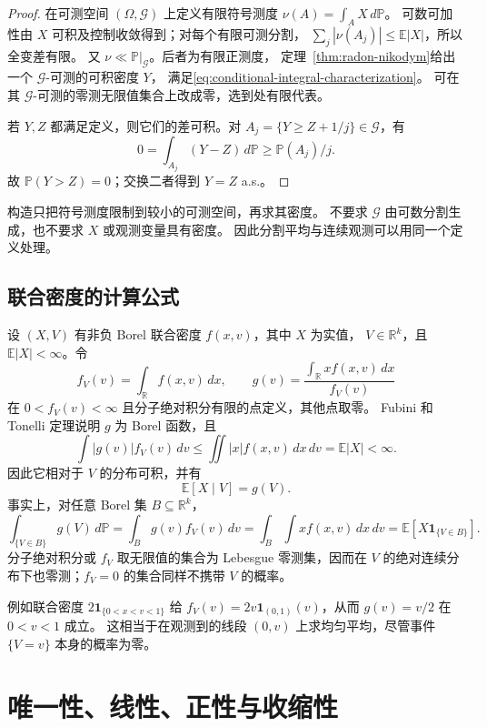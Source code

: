 \begin{proof}
在可测空间 $(\Omega,\mathcal G)$ 上定义有限符号测度
$\nu(A)=\int_A X\,d\mathbb P$。
可数可加性由 $X$ 可积及控制收敛得到；对每个有限可测分割，
$\sum_j|\nu(A_j)|\le\mathbb E|X|$，所以全变差有限。
又 $\nu\ll\mathbb P|_{\mathcal G}$。后者为有限正测度，
定理~\ref{thm:radon-nikodym}给出一个 $\mathcal G$-可测的可积密度 $Y$，
满足\eqref{eq:conditional-integral-characterization}。
可在其 $\mathcal G$-可测的零测无限值集合上改成零，选到处有限代表。

若 $Y,Z$ 都满足定义，则它们的差可积。对
$A_j=\{Y\ge Z+1/j\}\in\mathcal G$，有
\[
 0=\int_{A_j}(Y-Z)\,d\mathbb P\ge\mathbb P(A_j)/j.
\]
故 $\mathbb P(Y>Z)=0$；交换二者得到 $Y=Z$ a.s.。
\end{proof}

构造只把符号测度限制到较小的可测空间，再求其密度。
不要求 $\mathcal G$ 由可数分割生成，也不要求 $X$ 或观测变量具有密度。
因此分割平均与连续观测可以用同一个定义处理。

\subsection{联合密度的计算公式}

设 $(X,V)$ 有非负 Borel 联合密度 $f(x,v)$，其中 $X$ 为实值，
$V\in\mathbb R^k$，且 $\mathbb E|X|<\infty$。令
\[
 f_V(v)=\int_\mathbb R f(x,v)\,dx,\qquad
 g(v)=\frac{\int_\mathbb R xf(x,v)\,dx}{f_V(v)}
\]
在 $0<f_V(v)<\infty$ 且分子绝对积分有限的点定义，其他点取零。
Fubini 和 Tonelli 定理说明 $g$ 为 Borel 函数，且
\[
 \int|g(v)|f_V(v)\,dv
 \le\iint |x|f(x,v)\,dx\,dv=\mathbb E|X|<\infty.
\]
因此它相对于 $V$ 的分布可积，并有
\begin{equation}
\label{eq:conditional-density-mean}
 \mathbb E[X\mid V]=g(V).
\end{equation}
事实上，对任意 Borel 集 $B\subseteq\mathbb R^k$，
\[
 \int_{\{V\in B\}}g(V)\,d\mathbb P
 =\int_Bg(v)f_V(v)\,dv
 =\int_B\int xf(x,v)\,dx\,dv
 =\mathbb E[X\mathbf1_{\{V\in B\}}].
\]
分子绝对积分或 $f_V$ 取无限值的集合为 Lebesgue 零测集，因而在
$V$ 的绝对连续分布下也零测；$f_V=0$ 的集合同样不携带 $V$ 的概率。

例如联合密度 $2\mathbf1_{\{0<x<v<1\}}$ 给
$f_V(v)=2v\mathbf1_{(0,1)}(v)$，从而 $g(v)=v/2$ 在 $0<v<1$ 成立。
这相当于在观测到的线段 $(0,v)$ 上求均匀平均，尽管事件 $\{V=v\}$
本身的概率为零。

\section{唯一性、线性、正性与收缩性}
\label{sec:conditional-properties}

